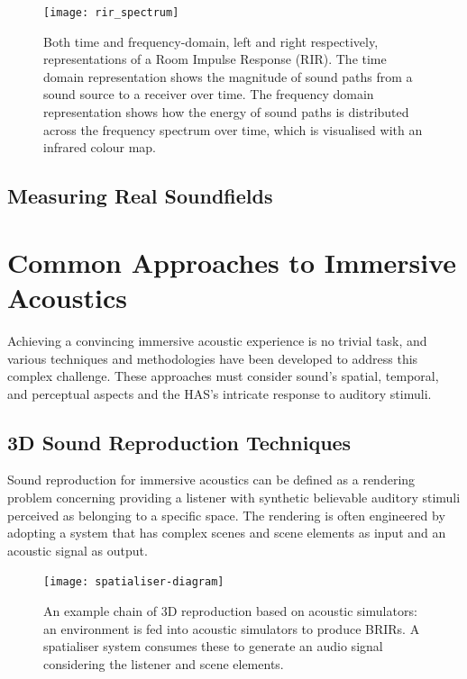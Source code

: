 \begin{figure}
    \centering
    \texttt{[image: rir\_spectrum]}
    \caption[Time and frequency-domain visualisation of a RIR]{Both time and frequency-domain, left and right respectively, representations of a Room Impulse Response (RIR). The time domain representation shows the magnitude of sound paths from a sound source to a receiver over time. The frequency domain representation shows how the energy of sound paths is distributed across the frequency spectrum over time, which is visualised with an infrared colour map.}
    \label{fig:rir-spectrum}
\end{figure}

\subsection{Measuring Real Soundfields}

\section{Common Approaches to Immersive Acoustics}
Achieving a convincing immersive acoustic experience is no trivial task, and various techniques and methodologies have been developed to address this complex challenge. These approaches must consider sound's spatial, temporal, and perceptual aspects and the HAS's intricate response to auditory stimuli.

\subsection{3D Sound Reproduction Techniques}
Sound reproduction for immersive acoustics can be defined as a rendering problem concerning providing a listener with synthetic believable auditory stimuli perceived as belonging to a specific space. The rendering is often engineered by adopting a system that has complex scenes and scene elements as input and an acoustic signal as output. 
\begin{figure}
    \centering
    \texttt{[image: spatialiser-diagram]}
    \caption[Basic spatialisation chain]{An example chain of 3D reproduction based on acoustic simulators: an environment is fed into acoustic simulators to produce BRIRs. A spatialiser system consumes these to generate an audio signal considering the listener and scene elements.}
    \label{fig:spatialiser-overview}
\end{figure}

